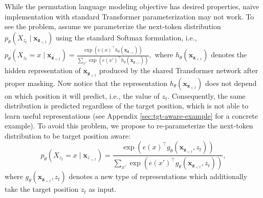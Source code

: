 \documentclass{article}
\newcommand{\expo}[1]{\exp \left( {#1} \right)}
\def\rvx{{\mathbf{x}}}
\def\rvz{{\mathbf{z}}}
\begin{document}
\label{sec:tgt-aware}
While the permutation language modeling objective has desired properties, naive implementation with standard Transformer parameterization may not work.
To see the problem, assume we parameterize the next-token distribution $p_\theta(X_{z_t} \mid \rvx_{\rvz_{<t}})$ using the standard Softmax formulation, i.e.,
$
p_\theta(X_{z_t} = x \mid \rvx_{\rvz_{<t}})
= \frac{\expo{ e(x)^\top h_\theta(\rvx_{\rvz_{<t}}) }}{\sum_{x'} \expo{ e(x')^\top h_\theta(\rvx_{\rvz_{<t}}) }},
$
where $h_\theta(\rvx_{\rvz_{<t}})$ denotes the hidden representation of $\rvx_{\rvz_{<t}}$ produced by the shared Transformer network after proper masking.
Now notice that the representation $h_\theta(\rvx_{\rvz_{<t}})$ does not depend on which position it will predict, i.e., the value of $z_t$.
Consequently, the same distribution is predicted regardless of the target position,
which is not able to learn useful representations (see Appendix \ref{sec:tgt-aware-example} for a concrete example).
To avoid this problem, we propose to re-parameterize the next-token distribution to be target position aware:
\begin{equation}
\label{eqn:tgt-aware}
p_\theta(X_{z_t} = x \mid \rvx_{z_{<t}})
= \frac{\expo{ e(x)^\top g_\theta(\rvx_{\rvz_{<t}}, z_t) }}{\sum_{x'} \expo{ e(x')^\top g_\theta(\rvx_{\rvz_{<t}}, z_t) }},
\end{equation}
where $g_\theta(\rvx_{\rvz_{<t}}, z_t)$ denotes a new type of representations which additionally take the target position $z_t$ as input. 
\end{document}
